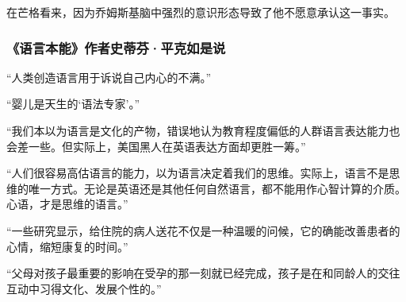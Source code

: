 在芒格看来，因为乔姆斯基脑中强烈的意识形态导致了他不愿意承认这一事实。
\par

\subsubsection*{《语言本能》作者史蒂芬·平克如是说}

“人类创造语言用于诉说自己内心的不满。”
\par

“婴儿是天生的‘语法专家’。”
\par

“我们本以为语言是文化的产物，错误地认为教育程度偏低的人群语言表达能力也会差一些。但实际上，美国黑人在英语表达方面却更胜一筹。”
\par

“人们很容易高估语言的能力，以为语言决定着我们的思维。实际上，语言不是思维的唯一方式。无论是英语还是其他任何自然语言，都不能用作心智计算的介质。心语，才是思维的语言。”
\par

“一些研究显示，给住院的病人送花不仅是一种温暖的问候，它的确能改善患者的心情，缩短康复的时间。”
\par

“父母对孩子最重要的影响在受孕的那一刻就已经完成，孩子是在和同龄人的交往互动中习得文化、发展个性的。”
\par

